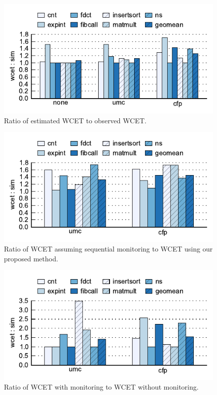 \begin{figure}
  \begin{center}
    \includegraphics{monitoring_wcet/data/wcet-sim.pdf}
    \caption{Ratio of estimated WCET to observed WCET.}
    \label{fig:monitoring_wcet.evaluation.wcet-sim}
  \end{center}
\end{figure}
\begin{figure}
  \begin{center}
    \includegraphics{monitoring_wcet/data/sequential-wcet.pdf}
    \caption{Ratio of WCET assuming sequential monitoring to WCET using our
    proposed method.}
    \label{fig:monitoring_wcet.evaluation.sequential-wcet}
  \end{center}
\end{figure}
\begin{figure}
  \begin{center}
    \includegraphics{monitoring_wcet/data/mon-none.pdf}
    \caption{Ratio of WCET with monitoring to WCET without monitoring.}
    \label{fig:monitoring_wcet.evaluation.mon-none}
  \end{center}
\end{figure}

